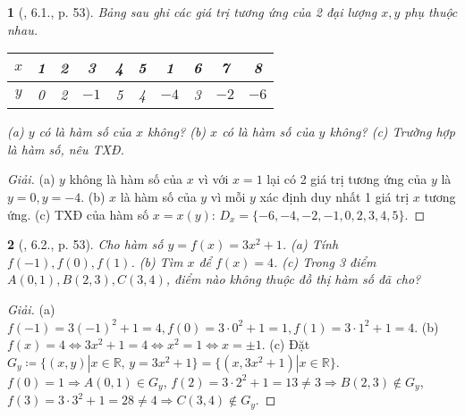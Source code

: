 \documentclass{article}
\newtheorem{baitoan}{}
\begin{document}
\begin{baitoan}[\cite{Binh_boi_duong_Toan_9_tap_1}, 6.1., p. 53]
	Bảng sau ghi các giá trị tương ứng của 2 đại lượng $x,y$ phụ thuộc nhau.
	\begin{table}[H]
		\centering
		\begin{tabular}{|c|c|c|c|c|c|c|c|c|c|}
			\hline
			$x$ & 1 & 2 & 3 & 4 & 5 & 1 & 6 & 7 & 8 \\
			\hline
			$y$ & 0 & 2 & $-1$ & 5 & 4 & $-4$ & 3 & $-2$ & $-6$ \\
			\hline
		\end{tabular}
	\end{table}
	\noindent(a) $y$ có là hàm số của $x$ không? (b) $x$ có là hàm số của $y$ không? (c) Trường hợp là hàm số, nêu {\rm TXĐ}.
\end{baitoan}

\begin{proof}[Giải]
	(a) $y$ không là hàm số của $x$ vì với $x = 1$ lại có 2 giá trị tương ứng của $y$ là $y = 0,y = -4$. (b) $x$ là hàm số của $y$ vì mỗi $y$ xác định duy nhất 1 giá trị $x$ tương ứng. (c) TXĐ của hàm số $x = x(y)$: $D_x = \{-6,-4,-2,-1,0,2,3,4,5\}$.
\end{proof}

\begin{baitoan}[\cite{Binh_boi_duong_Toan_9_tap_1}, 6.2., p. 53]
	Cho hàm số $y = f(x) = 3x^2 + 1$. (a) Tính $f(-1),f(0),f(1)$. (b) Tìm $x$ để $f(x) = 4$. (c) Trong 3 điểm $A(0,1),B(2,3),C(3,4)$, điểm nào không thuộc đồ thị hàm số đã cho?
\end{baitoan}

\begin{proof}[Giải]
	(a) $f(-1) = 3(-1)^2 + 1 = 4,f(0) = 3\cdot0^2 + 1 = 1,f(1) = 3\cdot1^2 + 1 = 4$. (b) $f(x) = 4\Leftrightarrow3x^2 + 1 = 4\Leftrightarrow x^2 = 1\Leftrightarrow x = \pm1$. (c) Đặt $G_y\coloneqq\{(x,y)|x\in\mathbb{R},\,y = 3x^2 + 1\} = \{(x,3x^2 + 1)|x\in\mathbb{R}\}$. $f(0) = 1\Rightarrow A(0,1)\in G_y$, $f(2) = 3\cdot2^2 + 1 = 13\ne3\Rightarrow B(2,3)\notin G_y$, $f(3) = 3\cdot3^2 + 1 = 28\ne4\Rightarrow C(3,4)\notin G_y$.
\end{proof}
\end{document}
